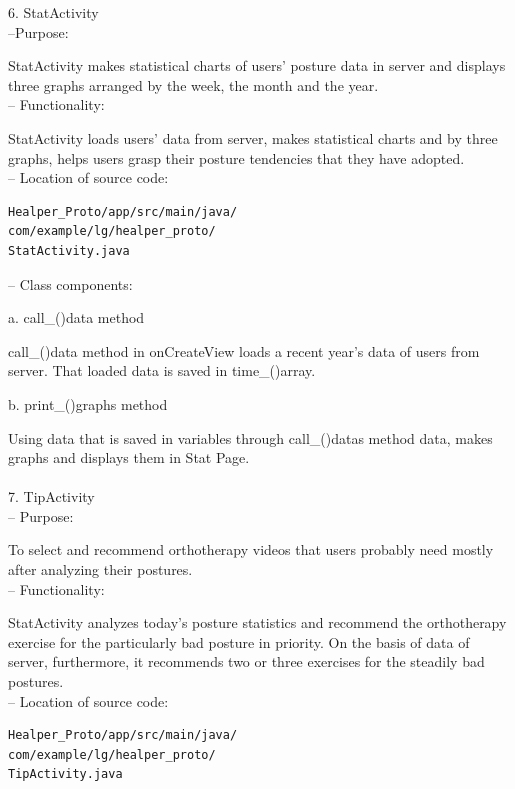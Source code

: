 \documentclass[conference]{IEEEtran}
\begin{document}
6.	StatActivity\\

 --Purpose:

StatActivity makes statistical charts of users' posture data in server and displays three graphs arranged by the week, the month and the year. \\

 --	Functionality:

StatActivity loads users' data from server, makes statistical charts and by three graphs, helps users grasp their posture tendencies that they have adopted. \\

 --	Location of source code:
 
\begin{verbatim}
Healper_Proto/app/src/main/java/
com/example/lg/healper_proto/
StatActivity.java
 \end{verbatim}
 
 --	Class components:
 
a. call\_()data method 

call\_()data method in onCreateView loads a recent year's data of users from server. That loaded data is saved in time\_()array.  

b. print\_()graphs method 

Using data that is saved in variables through call\_()datas method data, makes graphs and displays them in Stat Page.\\\\

7.	TipActivity\\

 --	Purpose:

To select and recommend orthotherapy videos that users probably need mostly after analyzing their postures. \\

 --	Functionality:

StatActivity analyzes today's posture statistics and recommend the orthotherapy exercise for the particularly bad posture in priority. On the basis of data of server, furthermore, it recommends two or three exercises for the steadily bad postures. \\

 --	Location of source code:
 
\begin{verbatim} 
Healper_Proto/app/src/main/java/
com/example/lg/healper_proto/
TipActivity.java
\end{verbatim}
\end{document}
